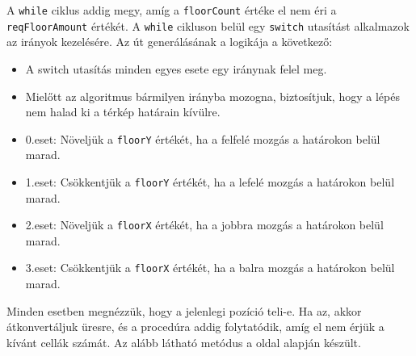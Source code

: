 A \texttt{while} ciklus addig megy, amíg a \texttt{floorCount} értéke el nem éri a \texttt{reqFloorAmount} értékét. A \texttt{while} cikluson belül egy \texttt{switch} utasítást alkalmazok az irányok kezelésére. Az út generálásának a logikája a következő:
\begin{itemize}
\item A switch utasítás minden egyes esete egy iránynak felel meg.
\item Mielőtt az algoritmus bármilyen irányba mozogna, biztosítjuk, hogy a lépés nem halad ki a térkép határain kívülre.
\item 0.eset: Növeljük a \texttt{floorY} értékét, ha a felfelé mozgás a határokon belül marad.
\item 1.eset: Csökkentjük a \texttt{floorY} értékét, ha a lefelé mozgás a határokon belül marad.
\item 2.eset: Növeljük a \texttt{floorX} értékét, ha a jobbra mozgás a határokon belül marad.
\item 3.eset: Csökkentjük a \texttt{floorX} értékét, ha a balra mozgás a határokon belül marad.
\end{itemize}

Minden esetben megnézzük, hogy a jelenlegi pozíció teli-e. Ha az, akkor átkonvertáljuk üresre, és a procedúra addig folytatódik, amíg el nem érjük a kívánt cellák számát. Az alább látható metódus a \cite{mapgenerator} oldal alapján készült.

